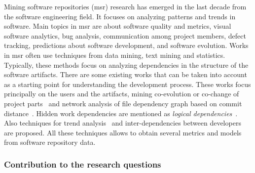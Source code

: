 \documentclass[a4paper,11pt]{article}
\begin{document}
Mining software repositories (\gls{msr}) research has emerged in the last decade from the software engineering field. It focuses on analyzing patterns and trends in software. Main topics in \gls{msr} are about software quality and metrics, visual software analytics, bug analysis, communication among project members, defect tracking, predictions about software development, and software evolution. 
Works in \gls{msr} often use techniques from data mining, text mining and statistics. Typically, these methods focus on analyzing dependencies in the structure of the software artifacts. There are some existing works that can be taken into account as a starting point for understanding the development process. These works focus principally on the users and the artifacts, mining co-evolution or co-change of project parts~\cite{Zaidman2008,DAmbros2009} and network analysis of file dependency graph based on commit distance~\cite{Zimmermann2008,Abate2009,Weicheng2013}. Hidden work dependencies are mentioned as \emph{logical dependencies}~\cite{Oliva2011}. Also techniques for trend analysis~\cite{Ruohonen2015} and inter-dependencies between developers~\cite{Lindberg2016} are proposed. All these techniques allows to obtain several metrics and models from software repository data. 

\subsubsection{Contribution to the research questions} 
\end{document}
